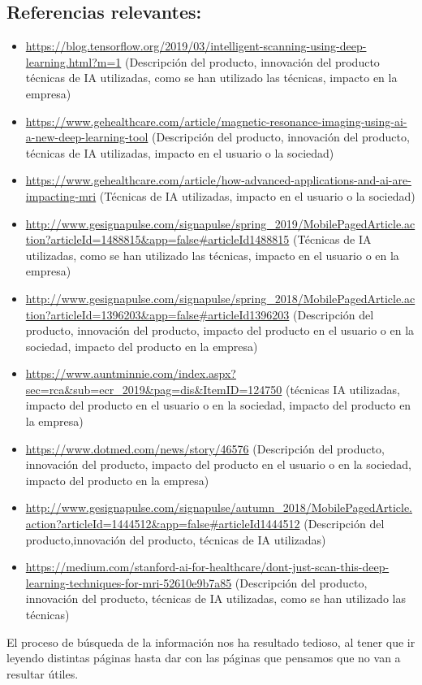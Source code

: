 \subsection{Referencias relevantes:}

\begin{itemize}

\item \url{https://blog.tensorflow.org/2019/03/intelligent-scanning-using-deep-learning.html?m=1}   (Descripción del producto, innovación del producto técnicas de IA utilizadas, como se han utilizado las técnicas, impacto en la empresa)
\item \url{https://www.gehealthcare.com/article/magnetic-resonance-imaging-using-ai-a-new-deep-learning-tool}   (Descripción del producto, innovación del producto, técnicas de IA utilizadas, impacto en el usuario o la sociedad)
\item \url{https://www.gehealthcare.com/article/how-advanced-applications-and-ai-are-impacting-mri}  (Técnicas de IA utilizadas, impacto en el usuario o la sociedad)
\item \url{http://www.gesignapulse.com/signapulse/spring_2019/MobilePagedArticle.action?articleId=1488815&app=false#articleId1488815} (Técnicas de IA utilizadas, como se han utilizado las técnicas, impacto en el usuario o en la empresa)
\item \url{http://www.gesignapulse.com/signapulse/spring_2018/MobilePagedArticle.action?articleId=1396203&app=false#articleId1396203} (Descripción del producto, innovación del producto, impacto del producto en el usuario o en la sociedad, impacto del producto en la empresa)
\item \url{https://www.auntminnie.com/index.aspx?sec=rca&sub=ecr_2019&pag=dis&ItemID=124750}  (técnicas IA utilizadas, impacto del producto en el usuario o en la sociedad, impacto del producto en la empresa)
\item \url{https://www.dotmed.com/news/story/46576}    (Descripción del producto, innovación del producto, impacto del producto en el usuario o en la sociedad, impacto del producto en la empresa)
\item \url{http://www.gesignapulse.com/signapulse/autumn_2018/MobilePagedArticle.action?articleId=1444512&app=false#articleId1444512}  (Descripción del producto,innovación del producto,  técnicas de IA utilizadas)
\item \url{https://medium.com/stanford-ai-for-healthcare/dont-just-scan-this-deep-learning-techniques-for-mri-52610e9b7a85}   (Descripción del producto, innovación del producto,  técnicas de IA utilizadas, como se han utilizado las técnicas)

\end{itemize}

El proceso de búsqueda de la información nos ha resultado tedioso, al tener que ir leyendo distintas páginas hasta dar con las páginas que pensamos que no van a resultar útiles.


    
    

